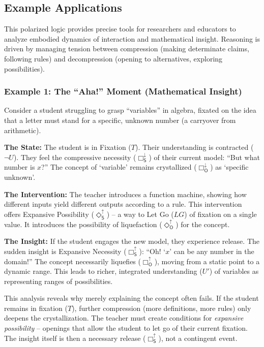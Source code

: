 \documentclass[12pt]{book}
\newcommand{\SBoxUp}{\Box_{\mathsf{S}}^{\uparrow}}
\newcommand{\SBoxDown}{\Box_{\mathsf{S}}^{\downarrow}}
\newcommand{\SDiaUp}{\Diamond_{\mathsf{S}}^{\uparrow}}
\newcommand{\OBoxUp}{\Box_{\mathsf{O}}^{\uparrow}}
\newcommand{\OBoxDown}{\Box_{\mathsf{O}}^{\downarrow}}
\newcommand{\ODiaUp}{\Diamond_{\mathsf{O}}^{\uparrow}}
\begin{document}
\subsection{Example Applications}

This polarized logic provides precise tools for researchers and educators to analyze embodied dynamics of interaction and mathematical insight. Reasoning is driven by managing tension between compression (making determinate claims, following rules) and decompression (opening to alternatives, exploring possibilities).

\subsubsection{Example 1: The ``Aha!'' Moment (Mathematical Insight)}

Consider a student struggling to grasp ``variables'' in algebra, fixated on the idea that a letter must stand for a specific, unknown number (a carryover from arithmetic).

\textbf{The State:} The student is in Fixation ($T$). Their understanding is contracted ($\neg U$). They feel the compressive necessity ($\SBoxDown$) of their current model: ``But what number is $x$?'' The concept of `variable' remains crystallized ($\OBoxDown$) as `specific unknown'.

\textbf{The Intervention:} The teacher introduces a function machine, showing how different inputs yield different outputs according to a rule. This intervention offers Expansive Possibility ($\SDiaUp$) -- a way to Let Go ($LG$) of fixation on a single value. It introduces the possibility of liquefaction ($\ODiaUp$) for the concept.

\textbf{The Insight:} If the student engages the new model, they experience release. The sudden insight is Expansive Necessity ($\SBoxUp$): ``Oh! `$x$' can be any number in the domain!'' The concept necessarily liquefies ($\OBoxUp$), moving from a static point to a dynamic range. This leads to richer, integrated understanding ($U'$) of variables as representing ranges of possibilities.

This analysis reveals why merely explaining the concept often fails. If the student remains in fixation ($T$), further compression (more definitions, more rules) only deepens the crystallization. The teacher must create conditions for \textit{expansive possibility} -- openings that allow the student to let go of their current fixation. The insight itself is then a necessary release ($\SBoxUp$), not a contingent event.
\end{document}
